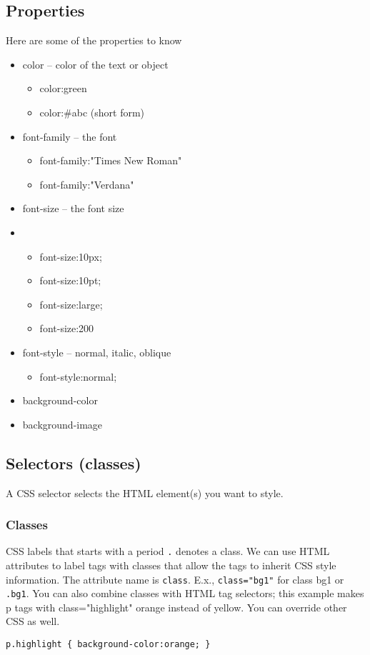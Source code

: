 \documentclass[../CMPUT-404-Notes.tex]{subfiles}
\begin{document}
\subsection{Properties}
Here are some of the properties to know 
\begin{itemize}
  \item color -- color of the text or object
  \begin{itemize}
    \item color:green
    \item color:\#abc (short form)
  \end{itemize}
  \item font-family -- the font
  \begin{itemize}
    \item font-family:"Times New Roman"
    \item font-family:"Verdana"
  \end{itemize}
  \item font-size -- the font size
  \item \begin{itemize}
    \item font-size:10px;
    \item font-size:10pt;
    \item font-size:large;
    \item font-size:200%
  \end{itemize}
  \item font-style -- normal, italic, oblique
  \begin{itemize}
    \item font-style:normal;
  \end{itemize}
  \item background-color 
  \item background-image
\end{itemize}

\subsection{Selectors (classes)}
A CSS selector selects the HTML element(s) you want to style.
\subsubsection{Classes}
CSS labels that starts with a period \texttt{.} denotes a class.
We can use HTML attributes to label tags with classes that allow the tags to inherit CSS style information. The attribute name is \texttt{class}. E.x., \texttt{class="bg1"} for class bg1 or \texttt{.bg1}.
You can also combine classes with HTML tag selectors; this example makes p tags with class="highlight" orange instead of yellow. You can override other CSS as well.
\begin{verbatim}
p.highlight { background-color:orange; }
\end{verbatim}
\end{document}
